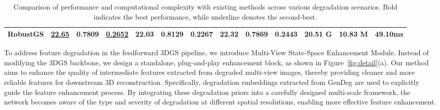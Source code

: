 \documentclass[letterpaper]{article} %
\newcommand{\NAMEfem}{Multi-View State-Space Enhancement Module\xspace}
\begin{document}
\begin{table}[ht]
\begin{tabular}{l|lll|lll|lll|lll}
RobustGS   & \underline{22.65}          & 0.7809          & \underline{0.2652}          & \textbf{22.03} & \textbf{0.8129} & \textbf{0.2267} & \textbf{22.32} & \textbf{0.7869} & \textbf{0.2443} & \multicolumn{1}{c}{\textbf{20.51 G}}                              & \multicolumn{1}{c}{\textbf{10.83 M}}                              & \multicolumn{1}{c}{\textbf{49.10ms}}
\\ \bottomrule
\end{tabular}

\caption{Comparison of performance and computational complexity with existing methods across various degradation scenarios. Bold indicates the best performance, while underline denotes the second-best.}
\label{table1}
\end{table}


To address feature degradation in the feedforward 3DGS pipeline, we introduce \NAMEfem. Instead of modifying the 3DGS backbone, we design a standalone, plug-and-play enhancement block, as shown in Figure~\ref{fig:detail}(a). Our method aims to enhance the quality of intermediate features extracted from degraded multi-view images, thereby providing cleaner and more reliable features for downstream 3D reconstruction. Specifically, degradation embeddings extracted from GenDeg are used to explicitly guide the feature enhancement process. By integrating these degradation priors into a carefully designed multi-scale framework, the network becomes aware of the type and severity of degradation at different spatial resolutions, enabling more effective feature enhancement.
\end{document}
